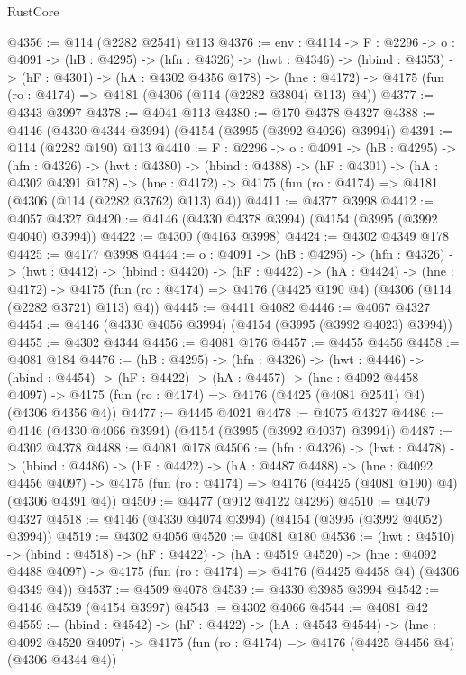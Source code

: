 \begin{lexlean}{RustCore}
\begin{coremodule}
@4356 := @114 (@2282 @2541) @113
@4376 := {env : @4114} ->
  {F : @2296} ->
  {o : @4091} ->
  (hB : @4295) ->
  (hfn : @4326) ->
  (hwt : @4346) ->
  (hbind : @4353) ->
  (hF : @4301) ->
  (hA : @4302 @4356 @178) ->
  (hne : @4172) -> @4175 (fun (ro : @4174) => @4181 (@4306 (@114 (@2282 @3804) @113) @4))
@4377 := @4343 @3997
@4378 := @4041 @113
@4380 := @170 @4378 @4327
@4388 := @4146 (@4330 @4344 @3994) (@4154 (@3995 (@3992 @4026) @3994))
@4391 := @114 (@2282 @190) @113
@4410 := {F : @2296} ->
  {o : @4091} ->
  (hB : @4295) ->
  (hfn : @4326) ->
  (hwt : @4380) ->
  (hbind : @4388) ->
  (hF : @4301) ->
  (hA : @4302 @4391 @178) ->
  (hne : @4172) -> @4175 (fun (ro : @4174) => @4181 (@4306 (@114 (@2282 @3762) @113) @4))
@4411 := @4377 @3998
@4412 := @4057 @4327
@4420 := @4146 (@4330 @4378 @3994) (@4154 (@3995 (@3992 @4040) @3994))
@4422 := @4300 (@4163 @3998)
@4424 := @4302 @4349 @178
@4425 := @4177 @3998
@4444 := {o : @4091} ->
  (hB : @4295) ->
  (hfn : @4326) ->
  (hwt : @4412) ->
  (hbind : @4420) ->
  (hF : @4422) ->
  (hA : @4424) ->
  (hne : @4172) ->
  @4175 (fun (ro : @4174) => @4176 (@4425 @190 @4) (@4306 (@114 (@2282 @3721) @113) @4))
@4445 := @4411 @4082
@4446 := @4067 @4327
@4454 := @4146 (@4330 @4056 @3994) (@4154 (@3995 (@3992 @4023) @3994))
@4455 := @4302 @4344
@4456 := @4081 @176
@4457 := @4455 @4456
@4458 := @4081 @184
@4476 := (hB : @4295) ->
  (hfn : @4326) ->
  (hwt : @4446) ->
  (hbind : @4454) ->
  (hF : @4422) ->
  (hA : @4457) ->
  (hne : @4092 @4458 @4097) ->
  @4175 (fun (ro : @4174) => @4176 (@4425 (@4081 @2541) @4) (@4306 @4356 @4))
@4477 := @4445 @4021
@4478 := @4075 @4327
@4486 := @4146 (@4330 @4066 @3994) (@4154 (@3995 (@3992 @4037) @3994))
@4487 := @4302 @4378
@4488 := @4081 @178
@4506 := (hfn : @4326) ->
  (hwt : @4478) ->
  (hbind : @4486) ->
  (hF : @4422) ->
  (hA : @4487 @4488) ->
  (hne : @4092 @4456 @4097) ->
  @4175 (fun (ro : @4174) => @4176 (@4425 (@4081 @190) @4) (@4306 @4391 @4))
@4509 := @4477 (@912 @4122 @4296)
@4510 := @4079 @4327
@4518 := @4146 (@4330 @4074 @3994) (@4154 (@3995 (@3992 @4052) @3994))
@4519 := @4302 @4056
@4520 := @4081 @180
@4536 := (hwt : @4510) ->
  (hbind : @4518) ->
  (hF : @4422) ->
  (hA : @4519 @4520) ->
  (hne : @4092 @4488 @4097) -> @4175 (fun (ro : @4174) => @4176 (@4425 @4458 @4) (@4306 @4349 @4))
@4537 := @4509 @4078
@4539 := @4330 @3985 @3994
@4542 := @4146 @4539 (@4154 @3997)
@4543 := @4302 @4066
@4544 := @4081 @42
@4559 := (hbind : @4542) ->
  (hF : @4422) ->
  (hA : @4543 @4544) ->
  (hne : @4092 @4520 @4097) -> @4175 (fun (ro : @4174) => @4176 (@4425 @4456 @4) (@4306 @4344 @4))

\end{coremodule}
\end{lexlean}
